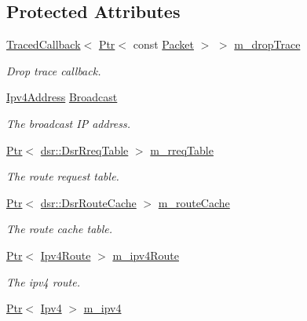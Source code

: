 \subsection*{Protected Attributes}
\begin{DoxyCompactItemize}
\item 
\hyperlink{classns3_1_1TracedCallback}{Traced\+Callback}$<$ \hyperlink{classns3_1_1Ptr}{Ptr}$<$ const \hyperlink{classns3_1_1Packet}{Packet} $>$ $>$ \hyperlink{classns3_1_1dsr_1_1DsrOptions_a176bbc9efb58b6d750c14b9b03c525c4}{m\+\_\+drop\+Trace}
\begin{DoxyCompactList}\small\item\em Drop trace callback. \end{DoxyCompactList}\item 
\hyperlink{classns3_1_1Ipv4Address}{Ipv4\+Address} \hyperlink{classns3_1_1dsr_1_1DsrOptions_a7e9380217477ad3d3e6b073edb64382d}{Broadcast}
\begin{DoxyCompactList}\small\item\em The broadcast IP address. \end{DoxyCompactList}\item 
\hyperlink{classns3_1_1Ptr}{Ptr}$<$ \hyperlink{classns3_1_1dsr_1_1DsrRreqTable}{dsr\+::\+Dsr\+Rreq\+Table} $>$ \hyperlink{classns3_1_1dsr_1_1DsrOptions_a386c046f3ea515e6c577f02b3378c2a7}{m\+\_\+rreq\+Table}
\begin{DoxyCompactList}\small\item\em The route request table. \end{DoxyCompactList}\item 
\hyperlink{classns3_1_1Ptr}{Ptr}$<$ \hyperlink{classns3_1_1dsr_1_1DsrRouteCache}{dsr\+::\+Dsr\+Route\+Cache} $>$ \hyperlink{classns3_1_1dsr_1_1DsrOptions_acc253711c35926e48590e46125646a1b}{m\+\_\+route\+Cache}
\begin{DoxyCompactList}\small\item\em The route cache table. \end{DoxyCompactList}\item 
\hyperlink{classns3_1_1Ptr}{Ptr}$<$ \hyperlink{classns3_1_1Ipv4Route}{Ipv4\+Route} $>$ \hyperlink{classns3_1_1dsr_1_1DsrOptions_ae4785209eae1d101cb8bd2d3b392d2ad}{m\+\_\+ipv4\+Route}
\begin{DoxyCompactList}\small\item\em The ipv4 route. \end{DoxyCompactList}\item 
\hyperlink{classns3_1_1Ptr}{Ptr}$<$ \hyperlink{classns3_1_1Ipv4}{Ipv4} $>$ \hyperlink{classns3_1_1dsr_1_1DsrOptions_aa4b94045e6c0467666c4e4efa63c7a4d}{m\+\_\+ipv4}

\end{DoxyCompactItemize}
